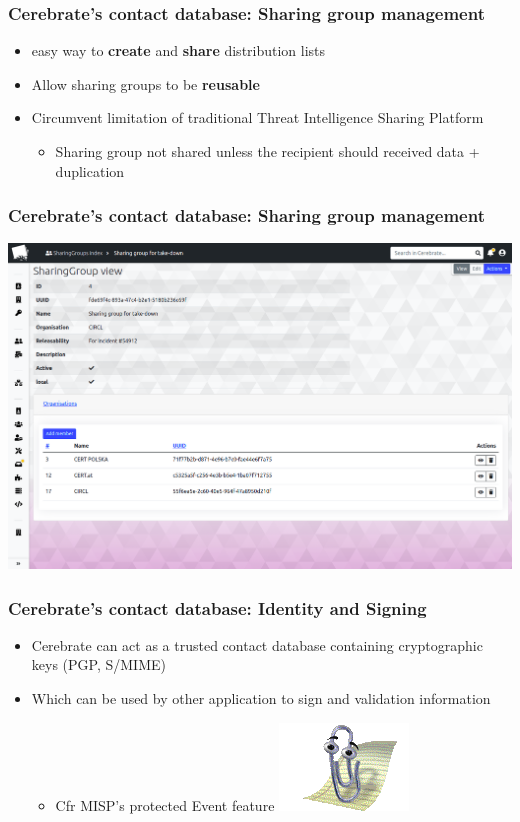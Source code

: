 \begin{frame}
\frametitle{Cerebrate's contact database: Sharing group management}
    \begin{itemize}
        \item easy way to \textbf{create} and \textbf{share} distribution lists
        \item Allow sharing groups to be \textbf{reusable}
        \item Circumvent limitation of traditional Threat Intelligence Sharing Platform
        \begin{itemize}
            \item Sharing group not shared unless the recipient should received data + duplication
        \end{itemize}
    \end{itemize}
\end{frame}

\begin{frame}
\frametitle{Cerebrate's contact database: Sharing group management}
    \begin{center}
        \includegraphics[width=0.9\linewidth]{pictures/sharinggroup.png}
    \end{center}
\end{frame}

\begin{frame}
\frametitle{Cerebrate's contact database: Identity and Signing}
    \begin{itemize}
        \item Cerebrate can act as a trusted contact database containing cryptographic keys (PGP, S/MIME)
        \item Which can be used by other application to sign and validation information
        \begin{itemize}
            \item Cfr MISP's protected Event feature \includegraphics[width=0.09\linewidth]{pictures/clippy-solo.png}
        \end{itemize}
    \end{itemize}
\end{frame}

